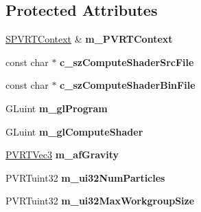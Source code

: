 \subsection*{Protected Attributes}
\begin{DoxyCompactItemize}
\item 
\hypertarget{class_particle_system_g_p_u_a355c9b4ebba7c410036db93d71a2fbd3}{\hyperlink{struct_s_p_v_r_t_context}{S\+P\+V\+R\+T\+Context} \& {\bfseries m\+\_\+\+P\+V\+R\+T\+Context}}\label{class_particle_system_g_p_u_a355c9b4ebba7c410036db93d71a2fbd3}

\item 
\hypertarget{class_particle_system_g_p_u_a110742113457558740bff8deb0315def}{const char $\ast$ {\bfseries c\+\_\+sz\+Compute\+Shader\+Src\+File}}\label{class_particle_system_g_p_u_a110742113457558740bff8deb0315def}

\item 
\hypertarget{class_particle_system_g_p_u_afe3b32540bfd5ee6f62145e591bd2a7b}{const char $\ast$ {\bfseries c\+\_\+sz\+Compute\+Shader\+Bin\+File}}\label{class_particle_system_g_p_u_afe3b32540bfd5ee6f62145e591bd2a7b}

\item 
\hypertarget{class_particle_system_g_p_u_aef360d4b877a8fba484e59a38210ca6e}{G\+Luint {\bfseries m\+\_\+gl\+Program}}\label{class_particle_system_g_p_u_aef360d4b877a8fba484e59a38210ca6e}

\item 
\hypertarget{class_particle_system_g_p_u_a5c9ea7c4931c49293de8a1f77ada3672}{G\+Luint {\bfseries m\+\_\+gl\+Compute\+Shader}}\label{class_particle_system_g_p_u_a5c9ea7c4931c49293de8a1f77ada3672}

\item 
\hypertarget{class_particle_system_g_p_u_aabb3137ceda66464379a14d7607ef2ea}{\hyperlink{struct_p_v_r_t_vec3}{P\+V\+R\+T\+Vec3} {\bfseries m\+\_\+af\+Gravity}}\label{class_particle_system_g_p_u_aabb3137ceda66464379a14d7607ef2ea}

\item 
\hypertarget{class_particle_system_g_p_u_a7fdbe8f49429e64e02205fa444d3f6a2}{P\+V\+R\+Tuint32 {\bfseries m\+\_\+ui32\+Num\+Particles}}\label{class_particle_system_g_p_u_a7fdbe8f49429e64e02205fa444d3f6a2}

\item 
\hypertarget{class_particle_system_g_p_u_aa19f3c034da1da2848d987dc800138bf}{P\+V\+R\+Tuint32 {\bfseries m\+\_\+ui32\+Max\+Workgroup\+Size}}\label{class_particle_system_g_p_u_aa19f3c034da1da2848d987dc800138bf}


\end{DoxyCompactItemize}
